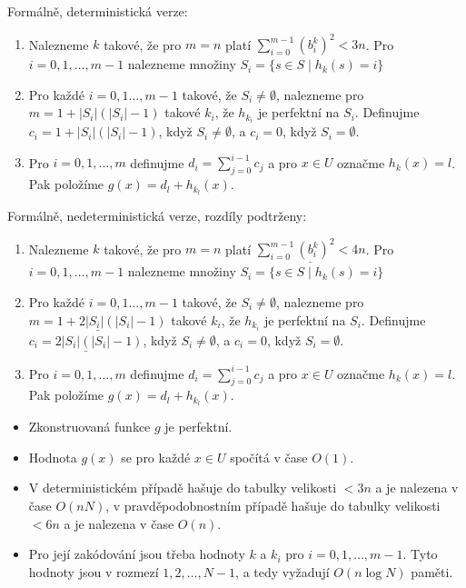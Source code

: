 \documentclass[a4paper,12pt]{article}
\newenvironment{pitemize}{
 \begin{itemize}
   \setlength{\itemsep}{1pt}
   \setlength{\parskip}{0pt}
   \setlength{\parsep}{0pt}
 }{\end{itemize}}
\begin{document}
Formálně, deterministická verze:

\begin{enumerate}
\item Nalezneme $k$ takové, že pro $m=n$ platí 
$\sum_{i=0}^{m-1}(b_i^k)^2<3n$.  Pro 
$i=0,1,\dots,m-1$ nalezneme množiny 
$S_i=\{s\in S\mid h_k(s)=i\}$
\item Pro každé $i=0,1\dots,m-1$ takové, že $S_i\ne\emptyset$, 
nalezneme pro $m=1+|S_i|(|S_i|-1)$ 
takové $k_i$, že $h_{k_i}$ je perfektní na $S_i$. Definujme 
$c_i=1+|S_i|(|S_i|-1)$, když 
$S_i\ne\emptyset$, a $c_i=0$, když 
$S_i=\emptyset$. 
\item Pro $i=0,1,\dots,m$ definujme $d_i=\sum_{j=0}^{i-1}c_j$ a pro $
x\in U$ 
označme $h_k(x)=l$. Pak položíme $g(x)=d_l+h_{k_l}(x)$.
\end{enumerate}

Formálně, nedeterministická verze, rozdíly podtrženy:

\begin{enumerate}
\item Nalezneme $k$ takové, že pro $m=n$ platí 
$\underline{\sum_{i=0}^{m-1}(b_i^
k)^2<4n}$.  Pro 
$i=0,1,\dots,m-1$ nalezneme množiny 
$S_i=\{s\in S\mid h_k(s)=i\}$ 
\item Pro každé $i=0,1\dots,m-1$ takové, že $S_i\ne\emptyset$, 
nalezneme pro $\underline{m=1+2|S_i|(|S_i|-
1)}$ 
takové $k_i$, že $h_{k_i}$ je perfektní na $S_i$. Definujme 
$\underline{c_i=2|S_i|(|S_i|-1)}$, když 
$S_i\ne\emptyset$, a $c_i=0$, když 
$S_i=\emptyset$.
\item Pro $i=0,1,\dots,m$ definujme $d_i=\sum_{j=0}^{i-1}c_j$ a pro $
x\in U$ 
označme $h_k(x)=l$. Pak položíme $g(x)=d_l+h_{k_l}(x)$.
\end{enumerate}



\begin{veta}
    \begin{pitemize}
        \item Zkonstruovaná funkce $g$ je perfektní. 
\item Hodnota $g(x)$ se pro každé $x\in U$ spočítá v čase $
O(1)$. 
\item V deterministickém přípa\-dě hašuje do tabulky velikosti 
$<3n$ a je nalezena v čase $O(nN)$, v pra\-vdě\-po\-do\-bno\-stním 
přípa\-dě hašuje do tabulky velikosti $<6n$ a je nalezena 
v čase $O(n)$.
\item Pro její zakódování jsou třeba hodnoty $
k$ a 
$k_i$ pro $i=0,1,\dots,m-1$. Tyto hodnoty jsou v rozmezí 
$1,2,\dots,N-1$, a tedy vyžadují $O(n\log N)$ paměti.
    \end{pitemize}
\end{veta}
\end{document}
